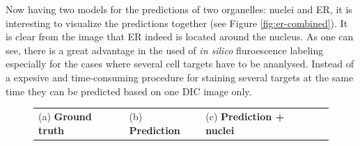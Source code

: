 Now having two models for the predictions of two organelles: nuclei and ER, it is interesting to visualize the predictions together (see Figure \ref{fig:er-combined}). It is clear from the image that ER indeed is located around the nucleus. As one can see, there is a great advantage in the used of \textit{in silico} fluroescence labeling especially for the cases where several cell targets have to be ananlysed. Instead of a expesive and time-consuming procedure for staining several targets at the same time they can be predicted based on one DIC image only.
\begin{figure}[htb]
    \centering
    \centering
        \begin{tabularx}{\textwidth}{YYYY}
            (a)  \textbf{Ground truth} &
            (b)  \textbf{Prediction} &
            (c)  \textbf{Prediction + nuclei} \\

\end{tabularx}
\end{figure}
